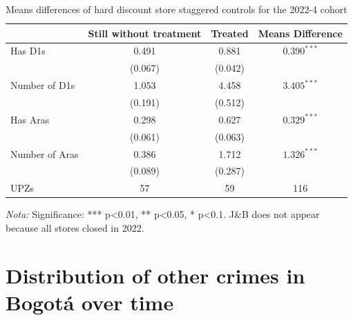 \documentclass[12pt]{article}
\begin{document}
\begin{table} [H]
  \centering
  \caption{Means differences of hard discount store staggered controls for the 2022-4 cohort}
  \label{tab:staggered_controls_2022}
  \begin{tabular}{l c c c}
    \toprule
    & \textbf{Still without treatment} & \textbf{Treated} & \textbf{Means Difference} \\
    \midrule
    Has D1s & 0.491 & 0.881 & $0.390^{***}$ \\
    & (0.067) & (0.042) & \\
    \midrule
    Number of D1s & 1.053 & 4.458 & $3.405^{***}$ \\
    & (0.191) & (0.512) & \\
    \midrule
    Has Aras & 0.298 & 0.627 & $0.329^{***}$ \\
    & (0.061) & (0.063) & \\
    \midrule
    Number of Aras & 0.386 & 1.712 & $1.326^{***}$ \\
    & (0.089) & (0.287) & \\
    \midrule
    UPZs & 57 & 59 & 116 \\
    \bottomrule
  \end{tabular}
  \parbox[t]{\textwidth}{%
    \vspace{0.5em}
    \footnotesize{ 
        \textit{Nota:} Significance: *** p<0.01, ** p<0.05, * p<0.1.
        J\&B does not appear because all stores closed in 2022. }}
\end{table}

\section{Distribution of other crimes in Bogotá over time}
\label{sec:othercrimemaps}
\end{document}
